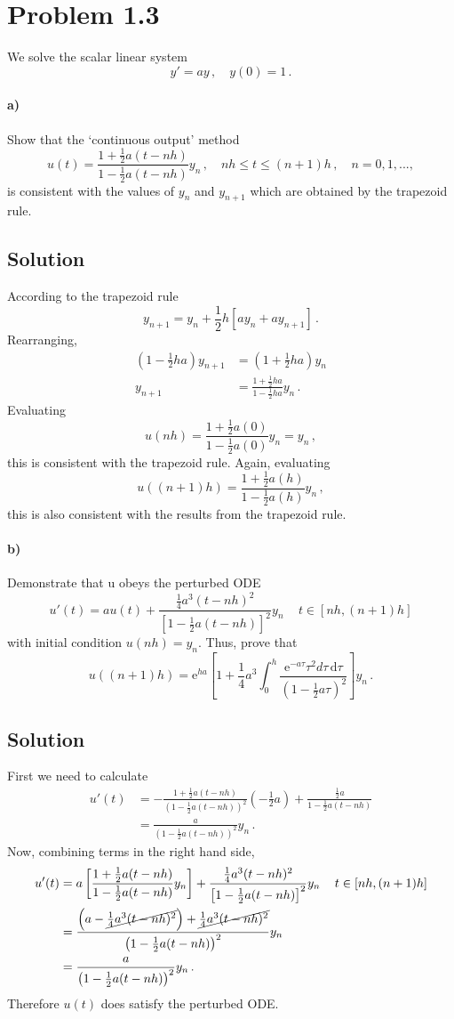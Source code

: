 \documentclass[10pt,letterpaper]{article}
\def\d{\mathrm{d}}
\def\e{\mathrm{e}}
\begin{document}
\section*{Problem 1.3}
We solve the scalar linear system
\[
y'=ay\,,\quad y(0)=1\,.
\]
\paragraph*{a)} Show that the `continuous output' method
\[
u(t)=\frac{1+\frac{1}{2}a(t-nh)}{1-\frac{1}{2}a(t-nh)}y_n\,,\quad nh\leq t\leq(n+1)h\,,\quad n=0,1,...,
\]
is consistent with the values of $y_n$ and $y_{n+1}$ which are obtained by the trapezoid rule.

\subsection*{Solution}
According to the trapezoid rule
\[
y_{n+1}=y_n+\frac{1}{2}h[ay_n+ay_{n+1}]\,.
\]
Rearranging,
\begin{align*}
\left(1-\frac{1}{2}ha\right)y_{n+1}&=\left(1+\frac{1}{2}ha\right)y_n\\
y_{n+1}&=\frac{1+\frac{1}{2}ha}{1-\frac{1}{2}ha}y_n\,.
\end{align*}
Evaluating
\[
u(nh)=\frac{1+\frac{1}{2}a(0)}{1-\frac{1}{2}a(0)}y_n=y_n\,,
\]
this is consistent with the trapezoid rule. Again, evaluating
\[
u((n+1)h)=\frac{1+\frac{1}{2}a(h)}{1-\frac{1}{2}a(h)}y_n\,,
\]
this is also consistent with the results from the trapezoid rule.

\paragraph*{b)} Demonstrate that u obeys the perturbed ODE
\[
u'(t)=au(t)+\frac{\frac{1}{4}a^3(t-nh)^2}{\left[1-\frac{1}{2}a(t-nh)\right]^2}y_n\,\quad t\in[nh,(n+1)h]
\]
with initial condition $u(nh)=y_n$. Thus, prove that
\[
u((n+1)h)=\e^{ha}\left[1+\frac{1}{4}a^3\int_0^h\frac{\e^{-a\tau}\tau^2 d\tau\,\d\tau}{\left(1-\frac{1}{2}a\tau\right)^2}\right]y_n\,.
\]

\subsection*{Solution}
First we need to calculate
\begin{align*}
u'(t)&=-\frac{1+\frac{1}{2}a(t-nh)}{\left(1-\frac{1}{2}a(t-nh)\right)^2}\left(-\frac{1}{2}a\right)+\frac{\frac{1}{2}a}{1-\frac{1}{2}a(t-nh)}\\
&=\frac{a}{\left(1-\frac{1}{2}a(t-nh)\right)^2}y_n\,.
\end{align*}
Now, combining terms in the right hand side,
\begin{align*}
u'(t)&=a\left[\frac{1+\frac{1}{2}a(t-nh)}{1-\frac{1}{2}a(t-nh)}y_n\right]
+\frac{\frac{1}{4}a^3(t-nh)^2}{\left[1-\frac{1}{2}a(t-nh)\right]^2}y_n\,\quad t\in[nh,(n+1)h]\\
&=\frac{\left(a-\cancel{\frac{1}{4}a^3(t-nh)^2}\right)+\cancel{\frac{1}{4}a^3(t-nh)^2}}{\left(1-\frac{1}{2}a(t-nh)\right)^2}y_n\\
&=\frac{a}{\left(1-\frac{1}{2}a(t-nh)\right)^2}y_n\,.
\end{align*}
Therefore $u(t)$ does satisfy the perturbed ODE.
\end{document}
